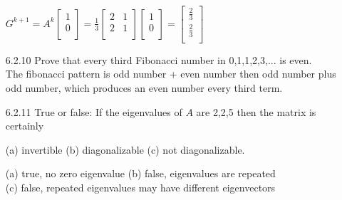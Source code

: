 \documentclass[10pt,twoside,reqno]{article}
\begin{document}
\begin{enumerate}
{%
{\addtolength{\leftskip}{5mm}
\begin{center}
$
G^{k+1}=A^k
\begin{bmatrix}
1\\
0\\
\end{bmatrix}
=
\frac{1}{3}
\begin{bmatrix}
2&1\\
2&1\\
\end{bmatrix}
\begin{bmatrix}
1\\
0\\
\end{bmatrix}
=
\begin{bmatrix}
\frac{2}{3}\\
\frac{2}{3}\\
\end{bmatrix}
$ \\
\end{center}
}
\vspace{3mm}
}
\item[6.2.10] Prove that every third Fibonacci number in 0,1,1,2,3,... is even.\\ \vspace{2mm}
{\addtolength{\leftskip}{5mm}
The fibonacci pattern is odd number + even number then odd number plus odd number, which produces an even number every third term. \\
}
\vspace{3mm}
\item[6.2.11] True or false: If the eigenvalues of $A$ are 2,2,5 then the matrix is certainly \\ 
\begin{center}
(a) invertible \hspace{10mm} (b) diagonalizable \hspace{10mm} (c) not diagonalizable. \\
\end{center}
\vspace{2mm}
{\addtolength{\leftskip}{5mm}
(a) true, no zero eigenvalue \hspace{4mm} (b) false, eigenvalues are repeated \\ (c) false, repeated eigenvalues may have different eigenvectors \\
}
\end{enumerate}
\end{document}
